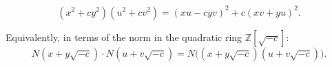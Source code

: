 $$(x^2 + cy^2)(u^2 + cv^2) = (xu - cyv)^2 + c(xv + yu)^2.$$

Equivalently, in terms of the norm in the quadratic ring $\mathbb{Z}[\sqrt{-c}]$:
$$N(x + y\sqrt{-c}) \cdot N(u + v\sqrt{-c}) = N\big((x + y\sqrt{-c})(u + v\sqrt{-c})\big).$$
